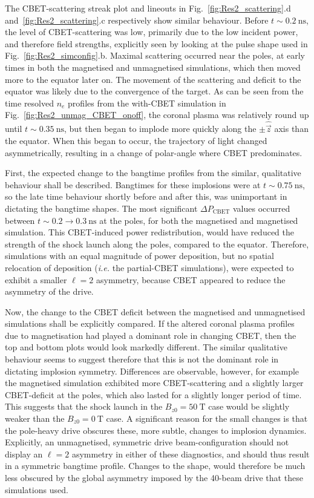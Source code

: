The \ac{CBET}-scattering streak plot and lineouts in Fig.~\ref{fig:Res2_scattering}.d and~\ref{fig:Res2_scattering}.c respectively show similar behaviour.
Before $t\sim0.2\ \text{ns}$, the level of \ac{CBET}-scattering was low, primarily due to the low incident power, and therefore field strengths, explicitly seen by looking at the pulse shape used in Fig.~\ref{fig:Res2_simconfig}.b.
Maximal scattering occurred near the poles, at early times in both the magnetised and unmagnetised simulations, which then moved more to the equator later on.
The movement of the scattering and deficit to the equator was likely due to the convergence of the target.
As can be seen from the time resolved $n_e$ profiles from the with-\ac{CBET} simulation in Fig.~\ref{fig:Res2_unmag_CBET_onoff}, the coronal plasma was relatively round up until $t\sim0.35\ \text{ns}$, but then began to implode more quickly along the $\pm\hat{\vec{z}}$ axis than the equator.
When this began to occur, the trajectory of light changed asymmetrically, resulting in a change of polar-angle where \ac{CBET} predominates.

First, the expected change to the bangtime profiles from the similar, qualitative behaviour shall be described.
Bangtimes for these implosions were at $t\sim0.75\ \text{ns}$, so the late time behaviour shortly before and after this, was unimportant in dictating the bangtime shapes.
The most significant $\Delta P_{\text{CBET}}$ values occurred between $t\sim0.2\rightarrow0.3\ \text{ns}$ at the poles, for both the magnetised and magnetised simulation.
This \ac{CBET}-induced power redistribution, would have reduced the strength of the shock launch along the poles, compared to the equator.
Therefore, simulations with an equal magnitude of power deposition, but no spatial relocation of deposition (\textit{i.e.} the partial-\ac{CBET} simulations), were expected to exhibit a smaller $\ell=2$ asymmetry, because \ac{CBET} appeared to reduce the asymmetry of the drive.

Now, the change to the \ac{CBET} deficit between the magnetised and unmagnetised simulations shall be explicitly compared.
If the altered coronal plasma profiles due to magnetisation had played a dominant role in changing \ac{CBET}, then the top and bottom plots would look markedly different.
The similar qualitative behaviour seems to suggest therefore that this is not the dominant role in dictating implosion symmetry.
Differences are observable, however, for example the magnetised simulation exhibited more \ac{CBET}-scattering and a slightly larger \ac{CBET}-deficit at the poles, which also lasted for a slightly longer period of time.
This suggests that the shock launch in the $B_{z0}=50\ \text{T}$ case would be slightly weaker than the $B_{z0}=0\ \text{T}$ case.
A significant reason for the small changes is that the pole-heavy drive obscures these, more subtle, changes to implosion dynamics.
Explicitly, an unmagnetised, symmetric drive beam-configuration should not display an $\ell=2$ asymmetry in either of these diagnostics, and should thus result in a symmetric bangtime profile.
Changes to the shape, would therefore be much less obscured by the global asymmetry imposed by the 40-beam drive that these simulations used.

